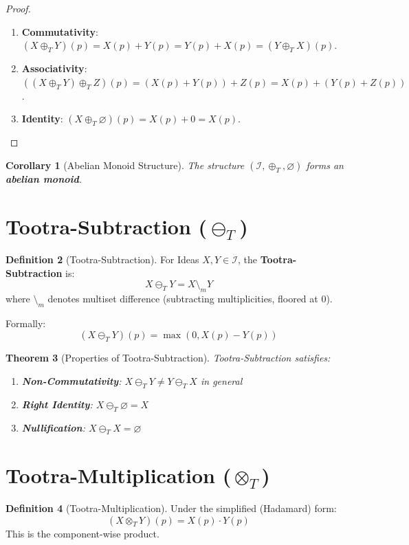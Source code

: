 \documentclass[11pt,twoside,openright]{book}
\theoremstyle{definition}
\newtheorem{definition}{Definition}[chapter]
\theoremstyle{plain}
\newtheorem{theorem}[definition]{Theorem}
\newtheorem{corollary}[definition]{Corollary}
\theoremstyle{remark}
\newcommand{\Ideas}{\mathcal{I}}
\newcommand{\Tadd}{\oplus_T}
\newcommand{\Tsub}{\ominus_T}
\newcommand{\Tmul}{\otimes_T}
\begin{document}
\begin{proof}
\begin{enumerate}
  \item \textbf{Commutativity}: $(X \Tadd Y)(p) = X(p) + Y(p) = Y(p) + X(p) = (Y \Tadd X)(p)$.
  \item \textbf{Associativity}: $((X \Tadd Y) \Tadd Z)(p) = (X(p) + Y(p)) + Z(p) = X(p) + (Y(p) + Z(p))$.
  \item \textbf{Identity}: $(X \Tadd \varnothing)(p) = X(p) + 0 = X(p)$.
\end{enumerate}
\end{proof}

\begin{corollary}[Abelian Monoid Structure]
\label{cor:tadd-monoid}
The structure $(\Ideas, \Tadd, \varnothing)$ forms an \textbf{abelian monoid}.
\end{corollary}

\section{Tootra-Subtraction ($\Tsub$)}

\begin{definition}[Tootra-Subtraction]
\label{def:tootra-sub}
For Ideas $X, Y \in \Ideas$, the \textbf{Tootra-Subtraction} is:
\[
X \Tsub Y = X \setminus_m Y
\]
where $\setminus_m$ denotes multiset difference (subtracting multiplicities, floored at 0).

Formally:
\[
(X \Tsub Y)(p) = \max(0, X(p) - Y(p))
\]
\end{definition}

\begin{theorem}[Properties of Tootra-Subtraction]
\label{thm:tsub-properties}
Tootra-Subtraction satisfies:
\begin{enumerate}
  \item \textbf{Non-Commutativity}: $X \Tsub Y \neq Y \Tsub X$ in general
  \item \textbf{Right Identity}: $X \Tsub \varnothing = X$
  \item \textbf{Nullification}: $X \Tsub X = \varnothing$
\end{enumerate}
\end{theorem}

\section{Tootra-Multiplication ($\Tmul$)}

\begin{definition}[Tootra-Multiplication]
\label{def:tootra-mul}
Under the simplified (Hadamard) form:
\[
(X \Tmul Y)(p) = X(p) \cdot Y(p)
\]
This is the component-wise product.
\end{definition}
\end{document}
